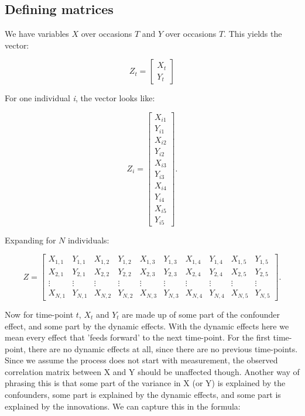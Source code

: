 \documentclass{article}
\begin{document}
\newpage

\subsection*{Defining matrices}

\noindent
We have variables $X$ over occasions $T$ and $Y$ over occasions $T$. This yields the vector:

\[
Z_t = \begin{bmatrix} X_t \\ Y_t \end{bmatrix}
\]

\noindent
For one individual \textit{i}, the vector looks like:

\[
Z_i =
\begin{bmatrix}
X_{i1} \\
Y_{i1} \\
X_{i2} \\
Y_{i2} \\
X_{i3} \\
Y_{i3} \\
X_{i4} \\
Y_{i4} \\
X_{i5} \\
Y_{i5}
\end{bmatrix}.
\]

\noindent
Expanding for $N$ individuals:

\[
Z =
\begin{bmatrix}
X_{1,1} & Y_{1,1} & X_{1,2} & Y_{1,2} & X_{1,3} & Y_{1,3} & X_{1,4} & Y_{1,4} & X_{1,5} & Y_{1,5} \\
X_{2,1} & Y_{2,1} & X_{2,2} & Y_{2,2} & X_{2,3} & Y_{2,3} & X_{2,4} & Y_{2,4} & X_{2,5} & Y_{2,5} \\
\vdots  & \vdots  & \vdots  & \vdots  & \vdots  & \vdots  & \vdots  & \vdots  & \vdots  & \vdots  \\
X_{N,1} & Y_{N,1} & X_{N,2} & Y_{N,2} & X_{N,3} & Y_{N,3} & X_{N,4} & Y_{N,4} & X_{N,5} & Y_{N,5}
\end{bmatrix}.
\]

\noindent
Now for time-point $t$, $X_t$ and $Y_t$ are made up of some part of the confounder effect, and some part by the dynamic effects. With
the dynamic effects here we mean every effect that 'feeds forward' to the next time-point. For the first time-point, there are no dynamic
effects at all, since there are no previous time-points. Since we assume the process does not start with measurement, the observed correlation
matrix between X and Y should be unaffected though. Another way of phrasing this is that some part of the variance in X (or Y) is explained 
by the confounders, some part is explained by the dynamic effects, and some part is explained by the innovations. We can capture this in the
formula:
\end{document}
